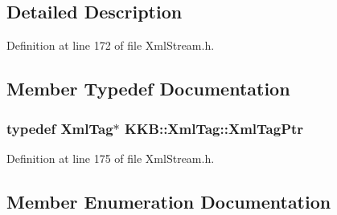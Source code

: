 \subsection{Detailed Description}


Definition at line 172 of file Xml\+Stream.\+h.



\subsection{Member Typedef Documentation}
\subsubsection[{\texorpdfstring{Xml\+Tag\+Ptr}{XmlTagPtr}}]{\setlength{\rightskip}{0pt plus 5cm}typedef {\bf Xml\+Tag}$\ast$ {\bf K\+K\+B\+::\+Xml\+Tag\+::\+Xml\+Tag\+Ptr}}\hypertarget{class_k_k_b_1_1_xml_tag_a7f2c41a39e872901afd7edf641f8271b}{}\label{class_k_k_b_1_1_xml_tag_a7f2c41a39e872901afd7edf641f8271b}


Definition at line 175 of file Xml\+Stream.\+h.



\subsection{Member Enumeration Documentation}
